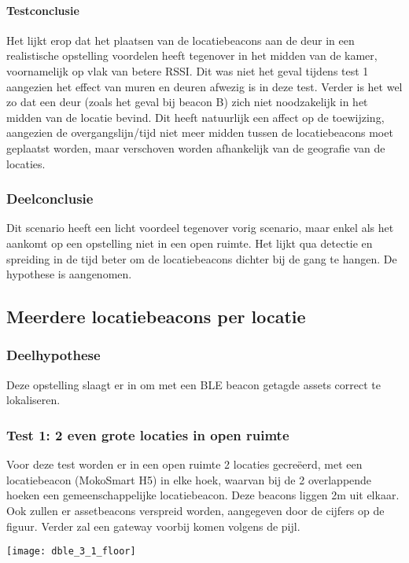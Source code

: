 \paragraph{Testconclusie}
Het lijkt erop dat het plaatsen van de locatiebeacons aan de deur in een realistische opstelling voordelen heeft tegenover in het midden van de kamer, voornamelijk op vlak van betere RSSI. Dit was niet het geval tijdens test 1 aangezien het effect van muren en deuren afwezig is in deze test. Verder is het wel zo dat een deur (zoals het geval bij beacon B) zich niet noodzakelijk in het midden van de locatie bevind. Dit heeft natuurlijk een affect op de toewijzing, aangezien de overgangslijn/tijd niet meer midden tussen de locatiebeacons moet geplaatst worden, maar verschoven worden afhankelijk van de geografie van de locaties.

\subsubsection{Deelconclusie}
Dit scenario heeft een licht voordeel tegenover vorig scenario, maar enkel als het aankomt op een opstelling niet in een open ruimte. Het lijkt qua detectie en spreiding in de tijd beter om de locatiebeacons dichter bij de gang te hangen. De hypothese is aangenomen.

\subsection{Meerdere locatiebeacons per locatie}
\subsubsection{Deelhypothese}
Deze opstelling slaagt er in om met een BLE beacon getagde assets correct te lokaliseren.

\subsubsection{Test 1: 2 even grote locaties in open ruimte}
\begin{minipage}{0.55\textwidth}
Voor deze test worden er in een open ruimte 2 locaties gecreëerd, met een locatiebeacon (MokoSmart H5) in elke hoek, waarvan bij de 2 overlappende hoeken een gemeenschappelijke locatiebeacon. Deze beacons liggen 2m uit elkaar. Ook zullen er assetbeacons verspreid worden, aangegeven door de cijfers op de figuur. Verder zal een gateway voorbij komen volgens de pijl. 
\end{minipage}
\hfill
\begin{minipage}{0.42\textwidth}
	\texttt{[image: dble\_3\_1\_floor]}
	\label{fig:ond-ble-dynamic-3-1-ops}
\end{minipage}

